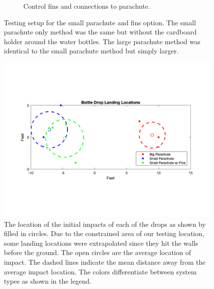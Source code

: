 \documentclass[]{auvsi_doc}
\begin{document}
\begin{figure}[h!]
\begin{subfigure}{0.49\linewidth}
		\caption{Control fins and connections to parachute.}\label{fig:ControlFins}
	\end{subfigure}
	\caption{Testing setup for the small parachute and fins option. The small parachute only method was the same but without the cardboard holder around the water bottles. The large parachute method was identical to the small parachute method but simply larger.}
	\label{fig:combined}
\end{figure}


\begin{figure}[h!]
\includegraphics[width=\columnwidth]{LandingLocations.png}
\caption{The location of the initial impacts of each of the drops as shown by filled in circles. Due to the constrained area of our testing location, some landing locations were extrapolated since they hit the walls before the ground. The open circles are the average location of impact. The dashed lines indicate the mean distance away from the average impact location. The colors differentiate between system types as shown in the legend.}
\label{fig:locations}
\end{figure}
\end{document}
